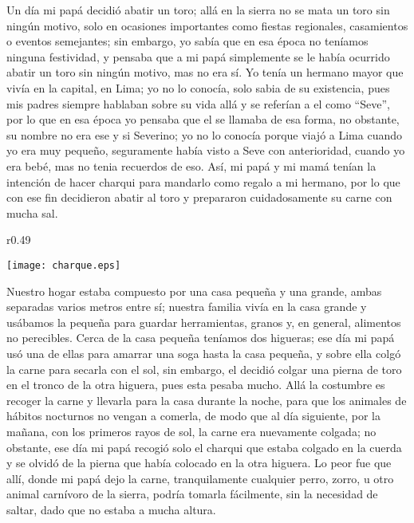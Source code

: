 Un día mi papá decidió abatir un toro; allá en la sierra no se mata un toro sin ningún motivo, solo en ocasiones importantes como fiestas regionales, casamientos o eventos semejantes; sin embargo, yo sabía que en esa época no teníamos ninguna festividad, y pensaba que a mi papá simplemente se le había ocurrido abatir un toro sin ningún motivo, mas no era sí.
Yo tenía un hermano mayor que vivía en la capital, en Lima; yo no lo conocía, solo sabia de su existencia, pues mis padres siempre hablaban sobre su vida allá y se referían a el como ``Seve'', por lo que en esa época yo pensaba que el se llamaba de esa forma, no obstante, su nombre no era ese y si Severino; yo no lo conocía porque viajó a Lima cuando yo era muy pequeño, seguramente había visto a Seve con anterioridad, cuando yo era bebé, mas no tenia recuerdos de eso.
Así, mi papá y mi mamá tenían la intención de hacer charqui para mandarlo como regalo a mi hermano, por lo que con ese fin decidieron abatir al toro y prepararon cuidadosamente su carne con mucha sal.

\begin{wrapfigure}{r}{0.49\textwidth}
  \begin{center}
  \vspace{-20pt}
    \texttt{[image: charque.eps]}
  \end{center}
  \vspace{-20pt}
\end{wrapfigure}
Nuestro hogar estaba compuesto por una casa pequeña y una grande, ambas separadas varios metros entre sí; nuestra familia vivía en la casa grande y usábamos la pequeña para guardar herramientas, granos y, en general, alimentos no perecibles.
Cerca de la casa pequeña teníamos dos higueras; ese día mi papá usó una de ellas para amarrar una soga hasta la casa pequeña, y sobre ella colgó la carne para secarla con el sol, sin embargo, el decidió colgar una pierna de toro en el tronco de la otra higuera, pues esta pesaba mucho.
Allá la costumbre es recoger la carne y llevarla para la casa durante la noche, para que los animales de hábitos nocturnos no vengan a comerla, de modo que al día siguiente, por la mañana, con los primeros rayos de sol, la carne era nuevamente colgada; no obstante, ese día mi papá recogió solo el charqui que estaba colgado en la cuerda y se olvidó de la pierna que había colocado en la otra higuera.
Lo peor fue que allí, donde mi papá dejo la carne, tranquilamente cualquier perro, zorro, u otro animal carnívoro de la sierra, podría tomarla fácilmente, sin la necesidad de saltar, dado que no estaba a mucha altura.

